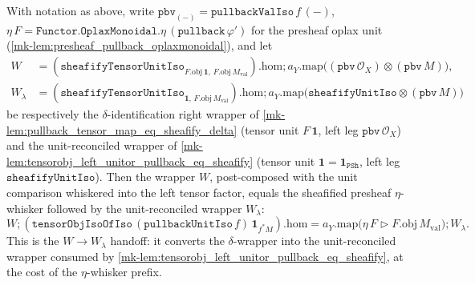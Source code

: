 \begin{lemma}\label{mk-lem:pullback_unit_iso_whisker_eq_sheafify_eta_whisker}
  \leanok

  With notation as above, write \(\mathtt{pbv}_{(-)} = \mathtt{pullbackValIso}\,f\,(-)\),
  \(\eta\,F = \mathtt{Functor.OplaxMonoidal.}\eta\,(\mathtt{pullback}\,\varphi')\) for the presheaf
  oplax unit (\ref{mk-lem:presheaf_pullback_oplaxmonoidal}), and let
  \begin{align*}
    W &= (\mathtt{sheafifyTensorUnitIso}_{F.\mathrm{obj}\,\mathbf 1,\,F.\mathrm{obj}\,M_{\mathrm{val}}}).\mathrm{hom}
      \mathbin{;} a_Y.\mathrm{map}\bigl((\mathtt{pbv}\,\mathcal{O}_X)\otimes(\mathtt{pbv}\,M)\bigr),\\
    W_{\lambda} &= (\mathtt{sheafifyTensorUnitIso}_{\mathbf 1,\,F.\mathrm{obj}\,M_{\mathrm{val}}}).\mathrm{hom}
      \mathbin{;} a_Y.\mathrm{map}\bigl(\mathtt{sheafifyUnitIso}\otimes(\mathtt{pbv}\,M)\bigr)
  \end{align*}
  be respectively the \(\delta\)-identification right wrapper of
  \ref{mk-lem:pullback_tensor_map_eq_sheafify_delta} (tensor unit \(F\,\mathbf 1\), left leg
  \(\mathtt{pbv}\,\mathcal{O}_X\)) and the unit-reconciled wrapper of
  \ref{mk-lem:tensorobj_left_unitor_pullback_eq_sheafify} (tensor unit \(\mathbf 1 =
  \mathbf 1_{\mathtt{PSh}}\), left leg \(\mathtt{sheafifyUnitIso}\)). Then the wrapper \(W\),
  post-composed with the unit comparison whiskered into the left tensor factor, equals the sheafified
  presheaf \(\eta\)-whisker followed by the unit-reconciled wrapper \(W_{\lambda}\):
  \[
    W \mathbin{;}
    (\mathtt{tensorObjIsoOfIso}\,(\mathtt{pullbackUnitIso}\,f)\,\mathbf 1_{f^{*}M}).\mathrm{hom}
    = a_Y.\mathrm{map}\bigl(\eta\,F \rhd F.\mathrm{obj}\,M_{\mathrm{val}}\bigr)
      \mathbin{;} W_{\lambda}.
  \]
  This is the \(W \to W_{\lambda}\) handoff: it converts the \(\delta\)-wrapper into the unit-reconciled
  wrapper consumed by \ref{mk-lem:tensorobj_left_unitor_pullback_eq_sheafify}, at the cost of the
  \(\eta\)-whisker prefix.
\end{lemma}
